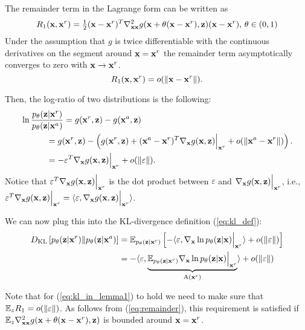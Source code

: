 The remainder term in the Lagrange form can be written as
\begin{equation}\label{eq:remainder}
    R_1(\rvx, \rvx^r) = \tfrac{1}{2}(\rvx - \rvx^r)^T \nabla^2_{\rvx\rvx} g(\rvx + \theta (\rvx - \rvx^r), \rvz) (\rvx - \rvx^r), \, \theta \in (0, 1)
\end{equation}
Under the assumption that $g$ is twice differentiable with the continuous derivatives on the segment around ${\mathbf{x}} = {\mathbf{x}}^r$ the remainder term asymptotically converges to zero with ${\mathbf{x}} \rightarrow {\mathbf{x}}^r$. 
\begin{equation}
    R_1({\mathbf{x}}, {\mathbf{x}}^r) = o(\|{\mathbf{x}} - {\mathbf{x}}^r\|).
\end{equation}

Then, the log-ratio of two distributions is the following:
\begin{align}
    &\ln \frac{p_{\theta}({\mathbf{z}}| {\mathbf{x}}^r)}{p_{\theta}({\mathbf{z}}|{\mathbf{x}}^a)}
    = g({\mathbf{x}}^r, {\mathbf{z}}) - g({\mathbf{x}}^a, {\mathbf{z}}) \\
    &\quad\quad\quad = g({\mathbf{x}}^r, {\mathbf{z}}) - \left( g({\mathbf{x}}^r, {\mathbf{z}}) + ({\mathbf{x}}^a - {\mathbf{x}}^r)^T \nabla_{{\mathbf{x}}} g({\mathbf{x}}, {\mathbf{z}}) \Big|_{{\mathbf{x}}^r} + o(\|{\mathbf{x}}^a - {\mathbf{x}}^r\|)\right). \\
    &\quad\quad\quad =  -\varepsilon^T\nabla_{{\mathbf{x}}} g({\mathbf{x}}, {\mathbf{z}}) \Big|_{{\mathbf{x}}^r} + o(\|\varepsilon\|) .
\end{align}
Notice that $\varepsilon^T \nabla_{{\mathbf{x}}} g({\mathbf{x}}, {\mathbf{z}}) \Big|_{{\mathbf{x}}^r} $ is the dot product between $\varepsilon$ and $\nabla_{{\mathbf{x}}} g({\mathbf{x}}, {\mathbf{z}}) \Big|_{{\mathbf{x}}^r} $, i.e., $\varepsilon^T \nabla_{{\mathbf{x}}} g({\mathbf{x}}, {\mathbf{z}}) \Big|_{{\mathbf{x}}^r}  = \langle \varepsilon, \nabla_{{\mathbf{x}}} g({\mathbf{x}}, {\mathbf{z}}) \Big|_{{\mathbf{x}}^r}  \rangle$.

We can now plug this into the KL-divergence definition (\ref{eq:kl_def}):
\begin{align}
     \KL{p_{\theta}(\rvz|\rvx^r)}{p_{\theta}(\rvz|\rvx^a)} &= \E_{p_{\theta}(\rvz|\rvx^r)} \left[ -\langle \varepsilon, \nabla_{\rvx} \ln p_{\theta}(\rvz|\rvx) \Big|_{\rvx^r}  \rangle + o(\|\varepsilon\|)\right] \\
     &=   -\langle \varepsilon, \underbrace{ \E_{p_{\theta}(\rvz|\rvx^r)}  \nabla_{\rvx} \ln p_{\theta}(\rvz|\rvx) \Big|_{\rvx^r}}_{\text{A}(\rvx^r)}  \rangle + o(\|\varepsilon\|) \label{eq:kl_in_lemma1}
\end{align}

Note that for (\ref{eq:kl_in_lemma1}) to hold we need to make sure that $\mathbb{E}_z R_1 = o(\|\varepsilon\|)$. As follows from (\ref{eq:remainder}), this requirement is satisfied if $\mathbb{E}_{z}\nabla^2_{{\mathbf{x}}{\mathbf{x}}} g({\mathbf{x}} + \theta ({\mathbf{x}} - {\mathbf{x}}^r), {\mathbf{z}})$ is bounded around ${\mathbf{x}} = {\mathbf{x}}^r$.

